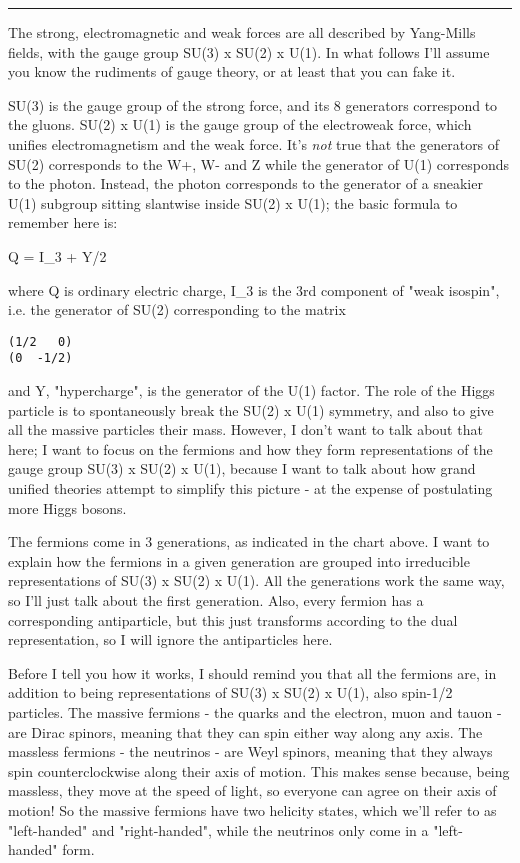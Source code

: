 \par\noindent\rule{\textwidth}{0.4pt}

The strong, electromagnetic and weak forces are all described by
Yang-Mills fields, with the gauge group SU(3) x SU(2) x U(1).  In what
follows I'll assume you know the rudiments of gauge theory, or at
least that you can fake it.

SU(3) is the gauge group of the strong force, and its 8 generators
correspond to the gluons.  SU(2) x U(1) is the gauge group of the
electroweak force, which unifies electromagnetism and the weak force.
It's \emph{not} true that the generators of SU(2) corresponds to the W+, W-
and Z while the generator of U(1) corresponds to the photon.  Instead,
the photon corresponds to the generator of a sneakier U(1) subgroup
sitting slantwise inside SU(2) x U(1); the basic formula to remember
here is:

Q = I_{3} + Y/2

where Q is ordinary electric charge, I_{3} is the 3rd component of
"weak isospin", i.e. the generator of SU(2) corresponding to the
matrix

\begin{verbatim}
(1/2   0)
(0  -1/2)
\end{verbatim}
    
and Y, "hypercharge", is the generator of the U(1) factor.  The role
of the Higgs particle is to spontaneously break the SU(2) x U(1)
symmetry, and also to give all the massive particles their mass.
However, I don't want to talk about that here; I want to focus on the
fermions and how they form representations of the gauge group SU(3) x
SU(2) x U(1), because I want to talk about how grand unified theories
attempt to simplify this picture - at the expense of postulating more
Higgs bosons.

The fermions come in 3 generations, as indicated in the chart above.
I want to explain how the fermions in a given generation are grouped
into irreducible representations of SU(3) x SU(2) x U(1).  All the
generations work the same way, so I'll just talk about the first
generation.  Also, every fermion has a corresponding antiparticle, but
this just transforms according to the dual representation, so I will
ignore the antiparticles here.

Before I tell you how it works, I should remind you that all the
fermions are, in addition to being representations of SU(3) x SU(2) x
U(1), also spin-1/2 particles.  The massive fermions - the quarks and
the electron, muon and tauon - are Dirac spinors, meaning that they
can spin either way along any axis.  The massless fermions - the
neutrinos - are Weyl spinors, meaning that they always spin
counterclockwise along their axis of motion.  This makes sense
because, being massless, they move at the speed of light, so everyone
can agree on their axis of motion!  So the massive fermions have two
helicity states, which we'll refer to as "left-handed" and
"right-handed", while the neutrinos only come in a "left-handed" form.

